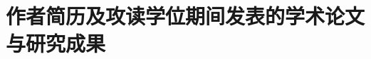 \chapter{作者简历及攻读学位期间发表的学术论文与研究成果}
\renewcommand{\leftmark}{作者简历及攻读学位期间发表的学术论文与研究成果}

\blindtext

\blindtext

\blindtext



